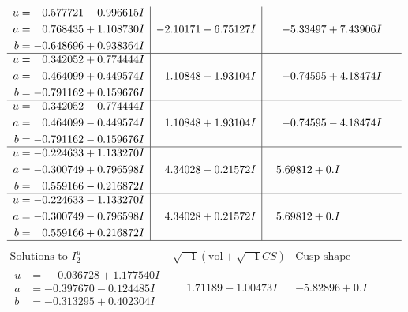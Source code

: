 \documentclass[1p]{elsarticle_modified}
\theoremstyle{definition}
\newcommand{\I}{\sqrt{-1}}
\begin{document}
$$\begin{array}{c|c|c}
\begin{aligned}
u &= -0.577721 - 0.996615 I \\
a &= \phantom{-}0.768435 + 1.108730 I \\
b &= -0.648696 + 0.938364 I\end{aligned}
 & -2.10171 - 6.75127 I & -5.33497 + 7.43906 I \\ \hline\begin{aligned}
u &= \phantom{-}0.342052 + 0.774444 I \\
a &= \phantom{-}0.464099 + 0.449574 I \\
b &= -0.791162 + 0.159676 I\end{aligned}
 & \phantom{-}1.10848 - 1.93104 I & -0.74595 + 4.18474 I \\ \hline\begin{aligned}
u &= \phantom{-}0.342052 - 0.774444 I \\
a &= \phantom{-}0.464099 - 0.449574 I \\
b &= -0.791162 - 0.159676 I\end{aligned}
 & \phantom{-}1.10848 + 1.93104 I & -0.74595 - 4.18474 I \\ \hline\begin{aligned}
u &= -0.224633 + 1.133270 I \\
a &= -0.300749 + 0.796598 I \\
b &= \phantom{-}0.559166 - 0.216872 I\end{aligned}
 & \phantom{-}4.34028 - 0.21572 I & \phantom{-}5.69812 + 0. I\phantom{ +0.000000I} \\ \hline\begin{aligned}
u &= -0.224633 - 1.133270 I \\
a &= -0.300749 - 0.796598 I \\
b &= \phantom{-}0.559166 + 0.216872 I\end{aligned}
 & \phantom{-}4.34028 + 0.21572 I & \phantom{-}5.69812 + 0. I\phantom{ +0.000000I}\\
 \hline 
 \end{array}$$\newpage$$\begin{array}{c|c|c}  
\text{Solutions to }I^u_{2}& \I (\text{vol} + \sqrt{-1}CS) & \text{Cusp shape}\\
 \hline 
\begin{aligned}
u &= \phantom{-}0.036728 + 1.177540 I \\
a &= -0.397670 - 0.124485 I \\
b &= -0.313295 + 0.402304 I\end{aligned}
 & \phantom{-}1.71189 - 1.00473 I & -5.82896 + 0. I\phantom{ +0.000000I} \\ \hline\begin{aligned}

\end{aligned}
\end{array}$$
\end{document}
